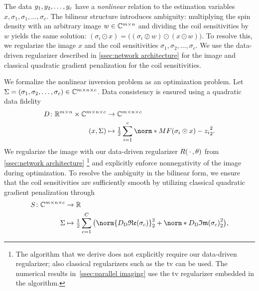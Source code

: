 The data \( y_{\num{1}}, y_{\num{2}}, \dotsc, y_c \) have a \emph{nonlinear} relation to the estimation variables \( x, \sigma_{\num{1}}, \sigma_{\num{1}}, \dotsc, \sigma_c \).
The bilinear structure introduces ambiguity: 
multiplying the spin density with an arbitrary image \( w \in \mathbb{C}^{m \times n} \) and dividing the coil sensitivities by \( w \) yields the same solution: \( (\sigma_i \odot x) = \bigl((\sigma_i \oslash w) \odot (x \odot w) \bigr)\).
To resolve this, we regularize the image \( x \) and the coil sensitivities \( \sigma_{\num{1}}, \sigma_{\num{2}}, \dotsc, \sigma_c \).
We use the data-driven regularizer described in \cref{ssec:network architecture} for the image and classical quadratic gradient penalization for the coil sensitivities.

We formalize the nonlinear inversion problem as an optimization problem.
Let \( \Sigma = (\sigma_{\num{1}}, \sigma_{\num{2}}, \dotsc, \sigma_c) \in \mathbb{C}^{m \times n \times c} \).
Data consistency is ensured using a quadratic data fidelity
\begin{equation}
	\begin{aligned}
		\map{D}{\R^{m\times n} \times\C^{m\times n \times c}&}{\C^{m\times n \times c}} \\
		(x, \Sigma) &\mapsto \Half \sum_{i=\num{1}}^c \norm*{\Mask\Fourier(\sigma_i \odot x) - z_i}_{\num{2}}^{\num{2}}.
	\end{aligned}
\end{equation}
We regularize the image with our data-driven regularizer \( R(\,\cdot\,, \theta) \) from \cref{ssec:network architecture} \footnote{%
	The algorithm that we derive does not explicitly require our data-driven regularizer;
	also classical regularizers such as the \gls{tv} can be used.
	The numerical results in~\cref{ssec:parallel imaging} use the \gls{tv} regularizer embedded in the algorithm.
} and explicitly enforce nonnegativity of the image during optimization.
To resolve the ambiguity in the bilinear form, we ensure that the coil sensitivities are sufficiently smooth by utilizing classical quadratic gradient penalization through
\begin{equation}
	\begin{aligned}
		\map{S}{\C^{m\times n \times c}&}{\R} \\
		\Sigma &\mapsto \Half \sum_{c=\num{1}}^{C} \big( \norm{\DiffOp_{\mathrm{D}} \mathfrak{Re}(\sigma_c)}_{\num{2}}^{\num{2}} + \norm*{\DiffOp_{\mathrm{D}} \mathfrak{Im}(\sigma_c)}_{\num{2}}^{\num{2}} \big),
	\end{aligned}
\end{equation}
